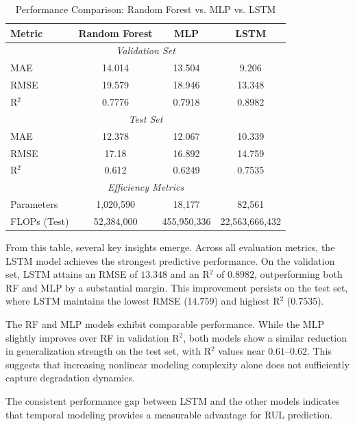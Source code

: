 \documentclass[conference]{IEEEtran}
\begin{document}
\begin{table}[H]
    \centering
    \caption{Performance Comparison: Random Forest vs. MLP vs. LSTM}
    \label{tab:model_comparison}
    \begin{tabular}{|l|c|c|c|}
        \hline
        \textbf{Metric} & \textbf{Random Forest} & \textbf{MLP} & \textbf{LSTM} \\
        \hline
        \multicolumn{4}{|c|}{\textit{Validation Set}} \\
        \hline
        MAE & 14.014 & 13.504 & 9.206 \\
        RMSE & 19.579 & 18.946 & 13.348 \\
        R$^2$ & 0.7776 & 0.7918 & 0.8982 \\
        \hline
        \multicolumn{4}{|c|}{\textit{Test Set}} \\
        \hline
        MAE & 12.378 & 12.067 & 10.339 \\
        RMSE & 17.18 & 16.892 & 14.759 \\
        R$^2$ & 0.612 & 0.6249 & 0.7535 \\
        \hline
        \multicolumn{4}{|c|}{\textit{Efficiency Metrics}} \\
        \hline
        Parameters & 1,020,590 & 18,177 & 82,561 \\
        FLOPs (Test) & 52,384,000 & 455,950,336 & 22,563,666,432 \\
        \hline
    \end{tabular}
\end{table}

From this table, several key insights emerge. Across all evaluation metrics, the LSTM model achieves the strongest predictive performance. On the validation set, LSTM attains an RMSE of $13.348$ and an R$^2$ of $0.8982$, outperforming both RF and MLP by a substantial margin. This improvement persists on the test set, where LSTM maintains the lowest RMSE ($14.759$) and highest R$^2$ ($0.7535$).

The RF and MLP models exhibit comparable performance. While the MLP slightly improves over RF in validation R$^2$, both models show a similar reduction in generalization strength on the test set, with R$^2$ values near $0.61$--$0.62$. This suggests that increasing nonlinear modeling complexity alone does not sufficiently capture degradation dynamics.

The consistent performance gap between LSTM and the other models indicates that temporal modeling provides a measurable advantage for RUL prediction.
\end{document}

